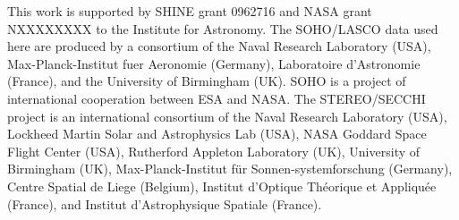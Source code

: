\documentclass[preprint2]{aastex}
\begin{document}


\acknowledgments

This work is supported by SHINE grant 0962716 and NASA grant NXXXXXXXX to the Institute for Astronomy. The SOHO/LASCO data used here are produced by a consortium of the Naval Research Laboratory (USA), Max-Planck-Institut fuer Aeronomie (Germany), Laboratoire d'Astronomie (France), and the University of Birmingham (UK). SOHO is a project of international cooperation between ESA and NASA. The STEREO/SECCHI project is an international consortium of the Naval Research Laboratory (USA), Lockheed Martin Solar and Astrophysics Lab (USA), NASA Goddard Space Flight Center (USA), Rutherford Appleton Laboratory (UK), University of Birmingham (UK), Max-Planck-Institut f\"{u}r Sonnen-systemforschung (Germany), Centre Spatial de Liege (Belgium), Institut d'Optique Th\'{e}orique et Appliqu\'{e}e (France), and Institut d'Astrophysique Spatiale (France). 




\end{document}
